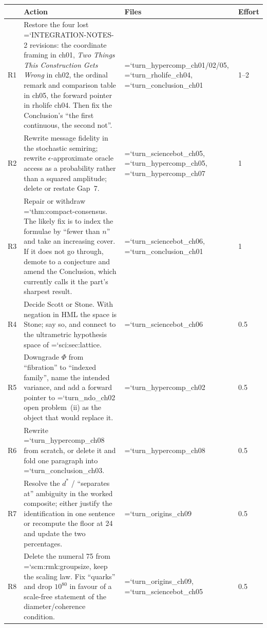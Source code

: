 \documentclass[11pt,letterpaper]{article}
\newcommand{\loc}[1]{{\small\ttfamily\color{accent}\hyphenchar\font=`\-\relax #1}}
\begin{document}
\begin{center}
\small
\begin{tabular}{@{}p{0.5cm}p{6.4cm}p{4.0cm}p{1.4cm}@{}}
\toprule
& \textbf{Action} & \textbf{Files} & \textbf{Effort} \\
\midrule
R1 & Restore the four lost \loc{INTEGRATION-NOTES-2} revisions: the
     coordinate framing in ch01, \emph{Two Things This Construction
     Gets Wrong} in ch02, the ordinal remark and comparison table in
     ch05, the forward pointer in rholife ch04. Then fix the
     Conclusion's ``the first continuous, the second not''.
   & \loc{turn\_hypercomp\_ch01/02/05}, \loc{turn\_rholife\_ch04},
     \loc{turn\_conclusion\_ch01}
   & 1--2 \\
\addlinespace
R2 & Rewrite message fidelity in the stochastic semiring; rewrite
     $\epsilon$-approximate oracle access as a probability rather than
     a squared amplitude; delete or restate Gap~7.
   & \loc{turn\_sciencebot\_ch05}, \loc{turn\_hypercomp\_ch05},
     \loc{turn\_hypercomp\_ch07}
   & 1 \\
\addlinespace
R3 & Repair or withdraw \loc{thm:compact-consensus}. The likely fix is
     to index the formulae by ``fewer than $n$'' and take an increasing
     cover. If it does not go through, demote to a conjecture and
     amend the Conclusion, which currently calls it the part's
     sharpest result.
   & \loc{turn\_sciencebot\_ch06}, \loc{turn\_conclusion\_ch01}
   & 1 \\
\addlinespace
R4 & Decide Scott or Stone. With negation in HML the space is Stone;
     say so, and connect to the ultrametric hypothesis space of
     \loc{sci:sec:lattice}.
   & \loc{turn\_sciencebot\_ch06}
   & 0.5 \\
\addlinespace
R5 & Downgrade $\Phi$ from ``fibration'' to ``indexed family'', name
     the intended variance, and add a forward pointer to
     \loc{turn\_ndo\_ch02} open problem~(ii) as the object that would
     replace it.
   & \loc{turn\_hypercomp\_ch02}
   & 0.5 \\
\addlinespace
R6 & Rewrite \loc{turn\_hypercomp\_ch08} from scratch, or delete it and
     fold one paragraph into \loc{turn\_conclusion\_ch03}.
   & \loc{turn\_hypercomp\_ch08}
   & 0.5 \\
\addlinespace
R7 & Resolve the $d^{\ast}$ / ``separates at'' ambiguity in the worked
     composite; either justify the identification in one sentence or
     recompute the floor at 24 and update the two percentages.
   & \loc{turn\_origins\_ch09}
   & 0.5 \\
\addlinespace
R8 & Delete the numeral 75 from \loc{scm:rmk:groupsize}, keep the
     scaling law. Fix ``quarks'' and drop $10^{80}$ in favour of a
     scale-free statement of the diameter/coherence condition.
   & \loc{turn\_origins\_ch09}, \loc{turn\_sciencebot\_ch05}
   & 0.5 \\
\bottomrule
\end{tabular}
\end{center}
\end{document}
